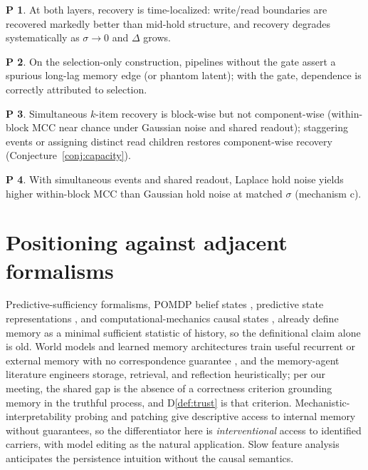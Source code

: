 \documentclass[11pt]{article}
\theoremstyle{plain}
\theoremstyle{definition}
\newtheorem{prediction}{P}
\begin{document}
\begin{prediction}\label{p:boundary}
At both layers, recovery is time-localized: write/read boundaries are recovered markedly better than mid-hold structure, and recovery degrades systematically as $\sigma \to 0$ and $\Delta$ grows.
\end{prediction}
\begin{prediction}\label{p:selection}
On the selection-only construction, pipelines without the gate assert a spurious long-lag memory edge (or phantom latent); with the gate, dependence is correctly attributed to selection.
\end{prediction}
\begin{prediction}\label{p:capacity}
Simultaneous $k$-item recovery is block-wise but not component-wise (within-block MCC near chance under Gaussian noise and shared readout); staggering events or assigning distinct read children restores component-wise recovery (Conjecture~\ref{conj:capacity}).
\end{prediction}
\begin{prediction}\label{p:ica}
With simultaneous events and shared readout, Laplace hold noise yields higher within-block MCC than Gaussian hold noise at matched $\sigma$ (mechanism c).
\end{prediction}

\section{Positioning against adjacent formalisms}\label{sec:related}

Predictive-sufficiency formalisms, POMDP belief states \cite{kaelbling1998}, predictive state representations \cite{littman2001}, and computational-mechanics causal states \cite{shalizi2001}, already define memory as a minimal sufficient statistic of history, so the definitional claim alone is old. World models and learned memory architectures train useful recurrent or external memory with no correspondence guarantee \cite{hafner2019, graves2016, wayne2018}, and the memory-agent literature \cite{zhang2024survey, packer2023, park2023, shinn2023, gutierrez2024} engineers storage, retrieval, and reflection heuristically; per our meeting, the shared gap is the absence of a correctness criterion grounding memory in the truthful process, and D\ref{def:trust} is that criterion. Mechanistic-interpretability probing and patching give descriptive access to internal memory without guarantees, so the differentiator here is \emph{interventional} access to identified carriers, with model editing \cite{meng2022, meng2023} as the natural application. Slow feature analysis \cite{wiskott2002} anticipates the persistence intuition without the causal semantics.
\end{document}
